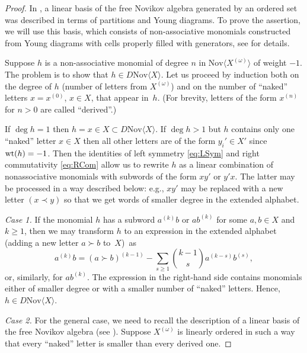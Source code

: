 \documentclass[pdftex]{sigma}
\numberwithin{equation}{section}
\def\Nov{\mathrm{Nov}}
\def\wt {\mathop {\fam 0 wt}\nolimits}
\begin{document}
\begin{proof}
In \cite{Dzhumad-codimgrowth}, a linear basis of the free Novikov algebra generated by an ordered set was described in terms of partitions and Young diagrams. To prove the assertion, we will use this basis, which consists of non-associative monomials constructed from Young diagrams with cells properly filled with generators, see \cite[Section~4]{Dzhumad-Ismailov} for details.

Suppose $h$ is a non-associative monomial of degree $n$
in $\Nov \bigl\langle X^{(\omega )}\bigr\rangle $
of weight $-1$.
The problem is to show that $h\in D\Nov\langle X\rangle $.
Let us proceed by induction both on the degree of $h$
\big(number of letters from $X^{(\omega )}$\big)
and on the number
of ``naked'' letters $x=x^{(0)}$, $x\in X$, that appear in~$h$.
\big(For brevity, letters of the form $x^{(n)}$ for $n>0$ are called ``derived''.\big)

If $\deg h=1$ then $h=x\in X \subset D\Nov\langle X\rangle $.
If $\deg h>1$ but $h$ contains only one ``naked'' letter $x\in X$
then all other letters are of the form $y_i'\in X'$ since
$\wt (h)=-1$. Then the identities of left symmetry \eqref{eq:LSym} and right commutativity \eqref{eq:RCom}
allow us to rewrite $h$ as a linear combination of nonassociative monomials with subwords of the form $xy'$ or $y'x$.
The latter may be processed in a way described below:
e.g., $xy'$ may be replaced with a new letter $(x\prec y)$
so that we get words of smaller degree in the extended alphabet.

{\it Case 1.} If the monomial $h$ has a subword
$a^{(k)}b$ or $ab^{(k)}$
for some $a,b\in X$ and $k\ge 1$,
then
we may transform $h$ to an expression in the extended alphabet (adding a new letter $a\succ b$ to~$X$)~as
\[
a^{(k)}b = (a\succ b)^{(k-1)} - \sum\limits_{s\ge 1} \binom{k-1}{s} a^{(k-s)}b^{(s)},
\]
or, similarly, for $ab^{(k)}$.
The expression in the right-hand side contains monomials either of smaller degree or with a smaller number of ``naked'' letters. Hence,
$h\in D\Nov \langle X\rangle $.

{\it Case 2.}
For the general case,
we need to recall the description of
a linear basis of the free Novikov algebra
(see \cite{Dzhumad-codimgrowth, Dzhumad-Ismailov, DzhLofwall2002}).
Suppose $X^{(\omega )}$ is linearly ordered in such a way
that every ``naked'' letter is smaller than every derived one.


\end{proof}
\end{document}

